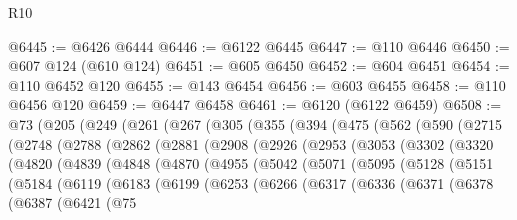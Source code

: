 \begin{lexlean}{R10}
\begin{coremodule}
@6445 := @6426 @6444
@6446 := @6122 @6445
@6447 := @110 @6446
@6450 := @607 @124 (@610 @124)
@6451 := @605 @6450
@6452 := @604 @6451
@6454 := @110 @6452 @120
@6455 := @143 @6454
@6456 := @603 @6455
@6458 := @110 @6456 @120
@6459 := @6447 @6458
@6461 := @6120 (@6122 @6459)
@6508 := @73
    (@205
      (@249
        (@261
          (@267
            (@305
              (@355
                (@394
                  (@475
                    (@562
                      (@590
                        (@2715
                          (@2748
                            (@2788
                              (@2862
                                (@2881
                                  (@2908
                                    (@2926
                                      (@2953
                                        (@3053
                                          (@3302
                                            (@3320
                                              (@4820
                                                (@4839
                                                  (@4848
                                                    (@4870
                                                      (@4955
                                                        (@5042
                                                          (@5071
                                                            (@5095
                                                              (@5128
                                                                (@5151
                                                                  (@5184
                                                                    (@6119
                                                                      (@6183
                                                                        (@6199
                                                                          (@6253
                                                                            (@6266
                                                                              (@6317
                                                                                (@6336
                                                                                  (@6371
                                                                                    (@6378
                                                                                      (@6387
                                                                                        (@6421
                                                                                          (@75

\end{coremodule}
\end{lexlean}
